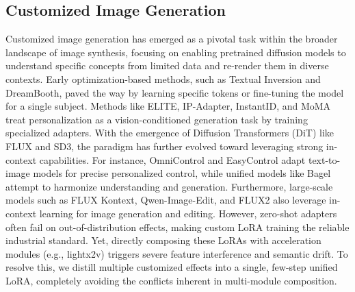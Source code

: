 \documentclass{llmxive}
\begin{document}
\subsection{Customized Image Generation}
Customized image generation has emerged as a pivotal task within the broader landscape of image synthesis, focusing on enabling pretrained diffusion models to understand specific concepts from limited data and re-render them in diverse contexts. Early optimization-based methods, such as Textual Inversion\cite{gal2022image} and DreamBooth\cite{ruiz2023dreambooth}, paved the way by learning specific tokens or fine-tuning the model for a single subject. 
Methods like ELITE\cite{wei2023elite}, IP-Adapter\cite{ye2023ip}, InstantID\cite{wang2024instantid}, and MoMA\cite{song2024moma} treat personalization as a vision-conditioned generation task by training specialized adapters. 
With the emergence of Diffusion Transformers (DiT)\cite{peebles2023scalable} like FLUX\cite{flux2024} and SD3\cite{esser2024scaling}, the paradigm has further evolved toward leveraging strong in-context capabilities. For instance, OmniControl\cite{xie2023omnicontrol} and EasyControl\cite{zhang2025easycontrol} adapt text-to-image models for precise personalized control, while unified models like Bagel\cite{deng2025emerging} attempt to harmonize understanding and generation. Furthermore, large-scale models such as FLUX Kontext\cite{labs2025flux}, Qwen-Image-Edit\cite{wu2025qwen}, and FLUX2\cite{flux-2-2025} also leverage in-context learning for image generation and editing. 
However, zero-shot adapters often fail on out-of-distribution effects, making custom LoRA training the reliable industrial standard. Yet, directly composing these LoRAs with acceleration modules (e.g., lightx2v\cite{lightx2v}) triggers severe feature interference and semantic drift. To resolve this, we distill multiple customized effects into a single, few-step unified LoRA, completely avoiding the conflicts inherent in multi-module composition.
\end{document}
